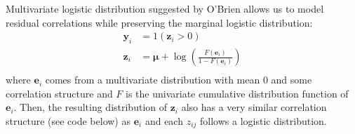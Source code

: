 \documentclass{article}\usepackage[]{graphicx}\usepackage[]{color}
\begin{document}
Multivariate logistic distribution suggested by O'Brien allows us to model residual correlations while preserving the marginal logistic distribution:
\begin{equation}
\begin{aligned}
\mathbf y_i &= 1(\mathbf z_i > 0)\\
\mathbf z_i &= \pmb \mu + \log \left(\frac{F(\mathbf e_i)}{1 - F(\mathbf e_i)} \right) \\
\end{aligned}
\end{equation}
where $\mathbf e_i$ comes from a multivariate distribution with mean 0 and some correlation structure and $F$ is the univariate cumulative distribution function of $\mathbf e_i$. Then, the resulting distribution of $\mathbf z_i$ also has a very similar correlation structure (see code below) as $\mathbf e_i$ and each $z_{ij}$ follows a logistic distribution.
\end{document}

